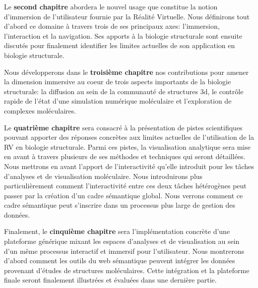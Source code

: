 Le \textbf{second chapitre} abordera le nouvel usage que constitue la notion d'immersion de l'utilisateur fournie par la Réalité Virtuelle. Nous définirons tout d'abord ce domaine à travers trois de ses principaux axes: l'immersion, l'interaction et la navigation. Ses apports à la biologie structurale sont ensuite discutés pour finalement identifier les limites actuelles de son application en biologie structurale.

Nous développerons dans le \textbf{troisième chapitre} nos contributions pour amener la dimension immersive au coeur de trois aspects importants de la biologie structurale: la diffusion au sein de la communauté de structures 3d, le contrôle rapide de l'état d'une simulation numérique moléculaire et l'exploration de complexes moléculaires.

Le \textbf{quatrième chapitre} sera consacré à la présentation de pistes scientifiques pouvant apporter des réponses concrètes aux limites actuelles de l'utilisation de la RV en biologie structurale. Parmi ces pistes, la visualisation analytique sera mise en avant à travers plusieurs de ses méthodes et techniques qui seront détaillées. Nous mettrons en avant l'apport de l'interactivité qu'elle introduit pour les tâches d'analyses et de visualisation moléculaire. Nous introduirons plus particulièrement comment l'interactivité entre ces deux tâches hétérogènes peut passer par la création d'un cadre sémantique global. Nous verrons comment ce cadre sémantique peut s'inscrire dans un processus plus large de gestion des données.

Finalement, le \textbf{cinquième chapitre} sera l'implémentation concrète d'une plateforme générique mixant les espaces d'analyses et de visualisation au sein d'un même processus interactif et immersif pour l'utilisateur. Nous montrerons d'abord comment les outils du web sémantique peuvent intégrer les données provenant d'études de structures moléculaires. Cette intégration et la plateforme finale seront finalement illustrées et évaluées dans une dernière partie.